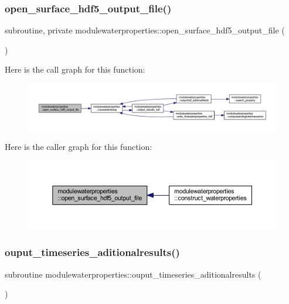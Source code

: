 \subsubsection{\texorpdfstring{open\+\_\+surface\+\_\+hdf5\+\_\+output\+\_\+file()}{open\_surface\_hdf5\_output\_file()}}
{\footnotesize\ttfamily subroutine, private modulewaterproperties\+::open\+\_\+surface\+\_\+hdf5\+\_\+output\+\_\+file (\begin{DoxyParamCaption}{ }\end{DoxyParamCaption})\hspace{0.3cm}{\ttfamily [private]}}

Here is the call graph for this function\+:\nopagebreak
\begin{figure}[H]
\begin{center}
\leavevmode
\includegraphics[width=350pt]{namespacemodulewaterproperties_a947e6ba82bfc1266159800996b8e073c_cgraph}
\end{center}
\end{figure}
Here is the caller graph for this function\+:\nopagebreak
\begin{figure}[H]
\begin{center}
\leavevmode
\includegraphics[width=350pt]{namespacemodulewaterproperties_a947e6ba82bfc1266159800996b8e073c_icgraph}
\end{center}
\end{figure}
\mbox{\label{namespacemodulewaterproperties_a98520e5c44c187e7d09c51cc9864bb63}} 
\subsubsection{\texorpdfstring{ouput\+\_\+timeseries\+\_\+aditionalresults()}{ouput\_timeseries\_aditionalresults()}}
{\footnotesize\ttfamily subroutine modulewaterproperties\+::ouput\+\_\+timeseries\+\_\+aditionalresults (\begin{DoxyParamCaption}{ }\end{DoxyParamCaption})\hspace{0.3cm}{\ttfamily [private]}}

